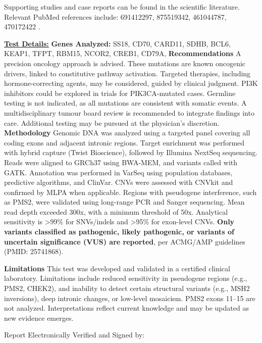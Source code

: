 \documentclass[11pt]{extarticle}
\begin{document}
Supporting studies and case reports can be found 
  in the scientific literature. Relevant PubMed references include: 691412297, 875519342, 461044787, 470172422 . \newpage


{\huge \bf \underline{Test Details:}} \newline
\newline
{\bf \Large Genes Analyzed: } SS18, CD70, CARD11, SDHB, BCL6, KEAP1, TFPT, RBM15, NCOR2, CREB1, CD79A,  \newline \newline
{\Large \bf Recommendations \newline}
A precision oncology approach is advised. These mutations are known oncogenic drivers, linked to constitutive pathway activation. Targeted therapies, including hormone-correcting agents, may be considered, guided by clinical judgment. PI3K inhibitors could be explored in trials for PIK3CA-mutated cases. Germline testing is not indicated, as all mutations are consistent with somatic events. A multidisciplinary tumour board review is recommended to integrate findings into care. Additional testing may be pursued at the physician’s discretion. 
\newline 
\newline
{\Large \bf Methodology \newline}
Genomic DNA was analyzed using a targeted panel covering all coding exons and adjacent intronic regions. Target enrichment was performed with hybrid capture (Twist Bioscience), followed by Illumina NextSeq sequencing. Reads were aligned to GRCh37 using BWA-MEM, and variants called with GATK. Annotation was performed in VarSeq using population databases, predictive algorithms, and ClinVar. CNVs were assessed with CNVkit and confirmed by MLPA when applicable. Regions with pseudogene interference, such as PMS2, were validated using long-range PCR and Sanger sequencing. Mean read depth exceeded 300x, with a minimum threshold of 50x. Analytical sensitivity is >99\% for SNVs/indels and >95\% for exon-level CNVs. {\bf Only variants classified as pathogenic, likely pathogenic, or variants of uncertain significance (VUS) are reported}, per ACMG/AMP guidelines (PMID: 25741868).

{\Large \bf Limitations \newline}
This test was developed and validated in a certified clinical laboratory. Limitations include reduced sensitivity in pseudogene regions (e.g., PMS2, CHEK2), and inability to detect certain structural variants (e.g., MSH2 inversions), deep intronic changes, or low-level mosaicism. PMS2 exons 11–15 are not analyzed. Interpretations reflect current knowledge and may be updated as new evidence emerges.

\newpage
{\huge Report Electronically Verified and Signed by: }
\end{document}
